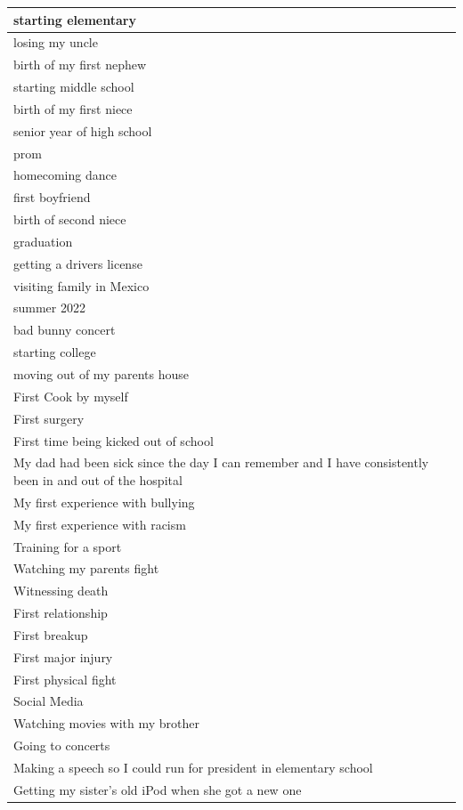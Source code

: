 \documentclass[
  .7em,
  letterpaper,
  DIV=11,
  numbers=noendperiod]{scrartcl}
\begin{document}
\begin{table}
\begin{tabular}{l}
\hline
starting elementary\\
\hline
losing my uncle\\
\hline
birth of my first nephew\\
\hline
starting middle school\\
\hline
birth of my first niece\\
\hline
senior year of high school\\
\hline
prom\\
\hline
homecoming dance\\
\hline
first boyfriend\\
\hline
birth of second niece\\
\hline
graduation\\
\hline
getting a drivers license\\
\hline
visiting family in Mexico\\
\hline
summer 2022\\
\hline
bad bunny concert\\
\hline
starting college\\
\hline
moving out of my parents house\\
\hline
First Cook by myself\\
\hline
First surgery\\
\hline
First time being kicked out of school\\
\hline
My dad had been sick since the day I can remember and I have consistently been in and out of the hospital\\
\hline
My first experience with bullying\\
\hline
My first experience with racism\\
\hline
Training for a sport\\
\hline
Watching my parents fight\\
\hline
Witnessing death\\
\hline
First relationship\\
\hline
First breakup\\
\hline
First major injury\\
\hline
First physical fight\\
\hline
Social Media\\
\hline
Watching movies with my brother\\
\hline
Going to concerts\\
\hline
Making a speech so I could run for president in elementary school\\
\hline
Getting my sister's old iPod when she got a new one\\

\end{tabular}
\end{table}
\end{document}
